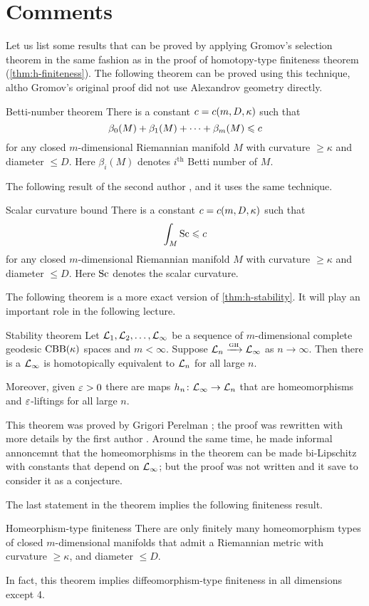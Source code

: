 \section{Comments}

Let us list some results that can be proved by applying Gromov's selection theorem
in the same fashion as in the proof of homotopy-type finiteness theorem (\ref{thm:h-finiteness}).
The following theorem can be proved using this technique, altho Gromov's original proof \cite{gromov-1981} did not use Alexandrov geometry directly.

\begin{thm}{Betti-number theorem}
There is a constant $c=c(m,D,\kappa)$ such that 
\[\beta_0(M)+\beta_1(M)+\dots+\beta_m(M)\leqslant c\]
for any closed $m$-dimensional Riemannian manifold $M$ with curvature $\ge \kappa$ and diameter $\le D$.
Here $\beta_i(M)$ denotes $i^\text{th}$ Betti number of $M$.
\end{thm}

The following result of the second author \cite{petrunin2008}, and it uses the same technique.

\begin{thm}{Scalar curvature bound}
There is a constant $c=c(m,D,\kappa)$ such that 
\[\int_M\mathrm{Sc}\leqslant c\]
for any closed $m$-dimensional Riemannian manifold $M$ with curvature $\ge \kappa$ and diameter $\le D$.
Here $\mathrm{Sc}$ denotes the scalar curvature.
\end{thm}

The following theorem is a more exact version of \ref{thm:h-stability}.
It will play an important role in the following lecture.

\begin{thm}{Stability theorem}\label{thm:stability}
Let $\mathcal{L}_1,\mathcal{L}_2,\dots,\mathcal{L}_\infty$ be a sequence of $m$-dimensional complete geodesic $\mathrm{CBB}(\kappa)$ spaces and $m<\infty$.
Suppose $\mathcal{L}_n\xrightarrow{\mbox{\tiny\rm GH}} \mathcal{L}_\infty$ as $n\to \infty$.
Then there is a $\mathcal{L}_\infty$ is homotopically equivalent to $\mathcal{L}_n$ for all large $n$.

Moreover, given $\varepsilon>0$ there are maps $h_n\colon\mathcal{L}_\infty\to \mathcal{L}_n$ that are homeomorphisms and $\varepsilon$-liftings for all large $n$.
\end{thm}

This theorem was proved by Grigori Perelman \cite{perelman1991};
the proof was rewritten with more details by the first author \cite{kapovitch}.
Around the same time, he made informal annoncemnt that the homeomorphisms in the theorem can be made bi-Lipschitz with constants that depend on $\mathcal{L}_\infty$;
but the proof was not written and it save to consider it as a conjecture.

The last statement in the theorem implies the following finiteness result.

\begin{thm}{Homeorphism-type finiteness}
There are only finitely many homeomorphism types of closed $m$-dimensional manifolds that admit a Riemannian metric with curvature $\ge \kappa$, and diameter $\le D$.
\end{thm}

In fact, this theorem implies diffeomorphism-type finiteness in all dimensions except 4.


